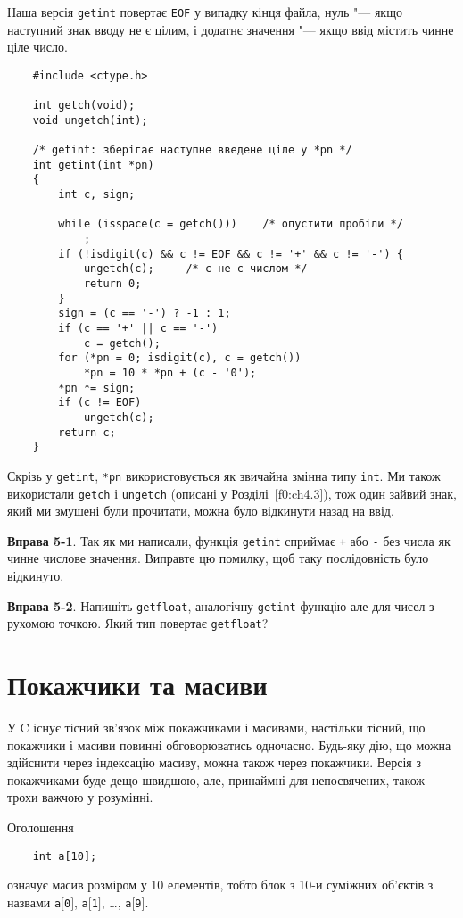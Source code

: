 \documentclass[a4paper,12pt]{book}
\begin{document}
  Наша версія \texttt{getint} повертає \texttt{EOF} у випадку кінця файла, нуль "---
  якщо наступний знак вводу не є цілим, і додатнє значення "--- якщо ввід містить чинне
  ціле число.
  \begin{verbatim}
    #include <ctype.h>

    int getch(void);
    void ungetch(int);

    /* getint: зберігає наступне введене ціле у *pn */
    int getint(int *pn)
    {
        int c, sign;

        while (isspace(c = getch()))    /* опустити пробіли */
            ;
        if (!isdigit(c) && c != EOF && c != '+' && c != '-') {
            ungetch(c);     /* c не є числом */
            return 0;
        }
        sign = (c == '-') ? -1 : 1;
        if (c == '+' || c == '-')
            c = getch();
        for (*pn = 0; isdigit(c), c = getch())
            *pn = 10 * *pn + (c - '0');
        *pn *= sign;
        if (c != EOF)
            ungetch(c);
        return c;
    }
  \end{verbatim}

  Скрізь у \texttt{getint}, \texttt{*pn} використовується як звичайна змінна типу
  \texttt{int}. Ми також використали \texttt{getch} і \texttt{ungetch} (описані у 
  Розділі~\ref{f0:ch4.3}), тож один зайвий знак, який ми змушені були прочитати,
  можна було відкинути назад на ввід.

  \textbf{Вправа 5-1}. Так як ми написали, функція \texttt{getint} сприймає \texttt{+} або
  \texttt{-} без числа як чинне числове значення. Виправте цю помилку, щоб таку
  послідовність було відкинуто.

  \textbf{Вправа 5-2}. Напишіть \texttt{getfloat}, аналогічну \texttt{getint} функцію але
  для чисел з рухомою точкою. Який тип повертає \texttt{getfloat}?

\section{Покажчики та масиви}


  У C існує тісний зв'язок між покажчиками і масивами, настільки тісний, що
  покажчики і масиви повинні обговорюватись одночасно. Будь-яку дію, що можна здійснити
  через індексацію масиву, можна також через покажчики. Версія з покажчиками буде дещо
  швидшою, але, принаймні для непосвячених, також трохи важчою у розумінні.

  Оголошення
  \begin{verbatim}
    int a[10];
  \end{verbatim}
  означує масив розміром у 10 елементів, тобто блок з 10-и суміжних об'єктів з назвами
  \texttt{a\mbox{$[$}0\mbox{$]$}}, \texttt{a\mbox{$[$}1\mbox{$]$}}, \ldots,
  \texttt{a\mbox{$[$}9\mbox{$]$}}.
\end{document}

